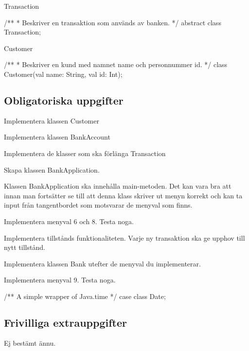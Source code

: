 Transaction

\begin{Code}
/**
 * Beskriver en transaktion som används av banken.
 */
abstract class Transaction;

\end{Code}


Customer

\begin{Code}
/**
 * Beskriver en kund med namnet name och personnummer id.
 */
class Customer(val name: String, val id: Int);

\end{Code}



\subsection{Obligatoriska uppgifter}

\Task Implementera klassen Customer

\Task Implementera klassen BankAccount

\Task Implementera de klasser som ska förlänga Transaction

\Task Skapa klassen BankApplication.

\Subtask Klassen BankApplication ska innehålla main-metoden. Det kan vara bra att innan man fortsätter se till att denna klass skriver ut menyn korrekt och kan ta input från tangentbordet som motsvarar de menyval som finns.

\Task Implementera menyval 6 och 8. Testa noga.

\Task Implementera tillstånds funktionaliteten. Varje ny transaktion ska ge upphov till nytt tillstånd.

\Task Implementera klassen Bank utefter de menyval du implementerar.

\Task Implementera menyval 9. Testa noga.


\begin{Code}
/** A simple wrapper of Java.time */
case class Date;
\end{Code}

\subsection{Frivilliga extrauppgifter}

\Task Ej bestämt ännu.

